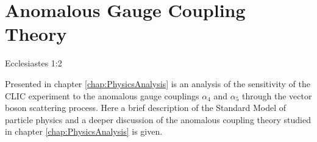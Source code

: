 \chapter{Anomalous Gauge Coupling Theory}
\label{chap:anomalousgaugecouplingtheory}

{Ecclesiastes 1:2}

Presented in chapter \ref{chap:PhysicsAnalysis} is an analysis of the sensitivity of the CLIC experiment to the anomalous gauge couplings $\alpha_{4}$ and $\alpha_{5}$ through the vector boson scattering process.  Here a brief description of the Standard Model of particle physics and a deeper discussion of the anomalous coupling theory studied in chapter \ref{chap:PhysicsAnalysis} is given.  

%
